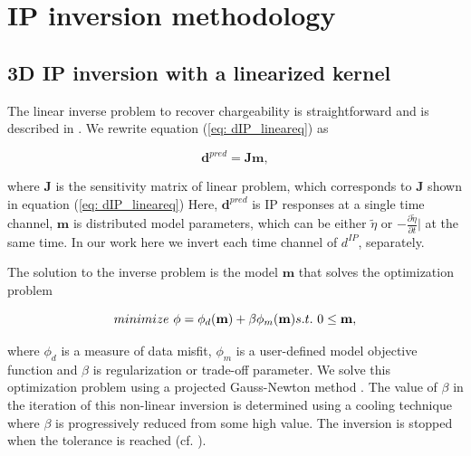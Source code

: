 \documentclass[extra,mreferee]{gji}
\newcommand{\peta}{\tilde{\eta}}
\begin{document}
\section{IP inversion methodology}

\subsection{3D IP inversion with a linearized kernel}
The linear inverse problem to recover chargeability is straightforward and is described in \cite{doug1994}. 
We rewrite equation (\ref{eq: dIP_lineareq}) as
\begin{linenomath*}
\begin{equation}
  \mathbf{d}^{pred} = \mathbf{J}\mathbf{m},
  \label{eq9}
\end{equation}
\end{linenomath*}
where $\mathbf{J}$ is the  sensitivity matrix of linear problem, which corresponds to $\mathbf{J}$ shown in equation (\ref{eq: dIP_lineareq}) 
Here, $\mathbf{d}^{pred}$ is IP responses at a single time channel, $\mathbf{m}$ is distributed model parameters, which can be either $\peta$ or $-\frac{\partial \peta}{\partial t}\big|$ at the same time. 
In our work here we invert each time channel of $d^{IP}$, separately. 

The solution to the inverse problem is the model $\mathbf{m}$ that solves the optimization problem
\begin{linenomath*}
\begin{equation}
  minimize \ \phi =  \phi_d(\mathbf{m}) + \beta\phi_m(\mathbf{m}) \\
  s.t. \ 0 \le \mathbf{m},
  \label{eq10}
\end{equation}
\end{linenomath*}
where $\phi_d$ is a measure of data misfit, $\phi_m$ is a user-defined model objective function and $\beta$ is regularization or trade-off parameter. We solve this optimization problem using a projected Gauss-Newton method \cite[]{Kelley}. 
The value of $\beta$ in the iteration of this non-linear inversion is determined using a cooling technique where $\beta$ is progressively reduced from some high value. The inversion is stopped when the tolerance is reached (cf. \cite{DougTutorial, Kang2014}). 
\end{document}
